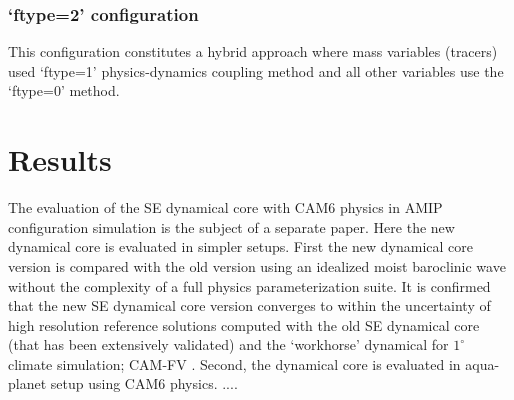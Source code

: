 \documentclass{agujournal}
\begin{document}
{\subsubsection{`ftype=2' configuration}
This configuration constitutes a hybrid approach where mass variables (tracers) used `ftype=1' physics-dynamics coupling method and all other variables use the `ftype=0' method.


\section{Results}\label{sec:results}
The evaluation of the SE dynamical core with CAM6 physics in AMIP configuration simulation is the subject of a separate paper. Here the new dynamical core is evaluated in simpler setups. First the new dynamical core version is compared with the old version using an idealized moist baroclinic wave without the complexity of a full physics parameterization suite. It is confirmed that the new SE dynamical core version converges to within the uncertainty of high resolution reference solutions computed with the old SE dynamical core (that has been extensively validated) and the `workhorse' dynamical for $1^\circ$ climate simulation; CAM-FV \citep[finit-volume][]{L2004MWR}. Second, the dynamical core is evaluated in aqua-planet setup \citep{NH2000ASL,WetAl2012NCAR,MWO2016JAMES} using CAM6 physics. .... {\color{red}{[bla bla ...]}}
}
\end{document}
